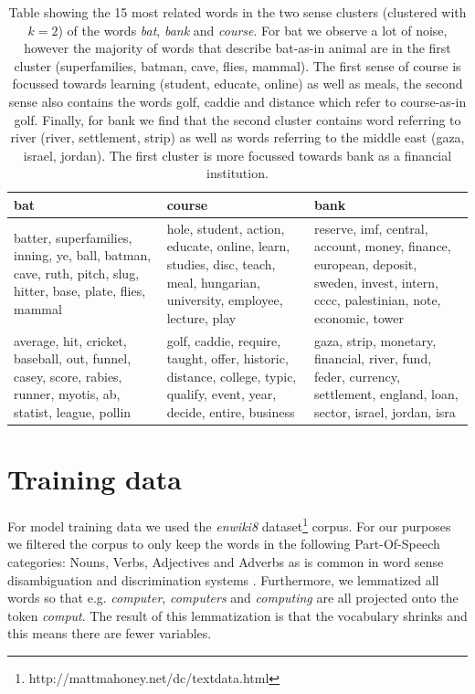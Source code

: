 \documentclass[11pt]{article}
\begin{document}
\begin{table}
    \begin{tabular}{|p{5cm}|p{5cm}|p{5cm}|}
    \hline
    \textbf{bat} & \textbf{course} & \textbf{bank}                                                                                                                                \\ \hline
    batter, superfamilies, inning, ye, ball, batman, cave, ruth, pitch, slug, hitter, base, plate, flies, mammal    & hole, student, action, educate, online, learn, studies, disc, teach, meal, hungarian, university, employee, lecture, play & reserve, imf, central, account, money, finance, european, deposit, sweden, invest, intern, cccc, palestinian, note, economic, tower \\ \hline
    average, hit, cricket, baseball, out, funnel, casey, score, rabies, runner, myotis, ab, statist, league, pollin & golf, caddie, require, taught, offer, historic, distance, college, typic, qualify, event, year, decide, entire, business  & gaza, strip, monetary, financial, river, fund, feder, currency, settlement, england, loan, sector, israel, jordan, isra             \\\hline
    \end{tabular}
    \caption{Table showing the 15 most related words in the two sense clusters (clustered with $k=2$) of the words \textit{bat}, \textit{bank} and \textit{course}. For bat we observe a lot of noise, however the majority of words that describe bat-as-in animal are in the first cluster (superfamilies, batman, cave, flies, mammal). The first sense of course is focussed towards learning (student, educate, online) as well as meals, the second sense also contains the words golf, caddie and distance which refer to course-as-in golf. Finally, for bank we find that the second cluster contains word referring to river (river, settlement, strip) as well as words referring to the middle east (gaza, israel, jordan). The first cluster is more focussed towards bank as a financial institution. }
\label{coconutres}

\end{table}

\section{Training data}
For model training data we used the \textit{enwiki8} dataset\footnote{http://mattmahoney.net/dc/textdata.html} corpus. For our purposes we filtered the corpus to only keep the words in the following Part-Of-Speech categories: Nouns, Verbs, Adjectives and Adverbs as is common in word sense disambiguation and discrimination systems \cite{survey}. Furthermore, we lemmatized all words so that e.g. \textit{computer}, \textit{computers} and \textit{computing} are all projected onto the token \textit{comput}. The result of this lemmatization is that the vocabulary shrinks and this means there are fewer variables.
\end{document}
